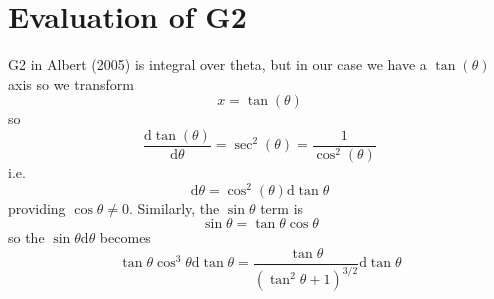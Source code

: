 \documentclass[]{article}
\begin{document}
%
%

\section{Evaluation of G2}
G2 in Albert (2005) is integral over theta, but in our case we have a $\tan(\theta)$ axis so we transform 
\begin{equation}
x = \tan(\theta)
\end{equation}
so
\begin{equation}
\frac{\mathrm{d} \tan(\theta)}{\mathrm{d} \theta} = \sec^2(\theta) = \frac{1}{\cos^2(\theta)}
\end{equation}
i.e.
\begin{equation}
\mathrm{d} \theta = \cos^2(\theta) \mathrm{d}\tan\theta
\end{equation}
providing $\cos\theta \ne 0$. Similarly, the $\sin\theta$ term is 
\begin{equation}
\sin\theta = \tan \theta \cos\theta 
\end{equation}
so the $\sin\theta \mathrm{d}\theta$ becomes
\begin{equation}
\tan\theta \cos^3\theta \mathrm{d}\tan\theta= \frac{\tan\theta}{(\tan^2 \theta + 1)^{3/2}}\mathrm{d}\tan\theta
\end{equation}


\begin{equation}
\end{equation}
\end{document}
